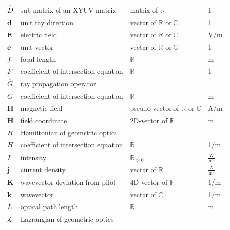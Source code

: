\documentclass[12pt,a4paper,twoside,openright,BCOR10mm,headsepline,titlepage,abstracton,chapterprefix,final]{scrreprt}
\newcommand\Vector[1]{{\mathbf{#1}}}
\newcommand\wavenumber{k}
\newcommand\Wavevector{\Vector{\wavenumber}}
\newcommand\scalarEfield{E}
\newcommand\scalarHfield{H}
\newcommand\Efield{\Vector{\scalarEfield}}
\newcommand\Hfield{\Vector{\scalarHfield}}
\newcommand\currentdensity{\Vector{j}}
\newcommand\meter{\textrm{m}}
\newcommand\ampere{\textrm{A}}
\newcommand\volt{\textrm{V}}
\newcommand\watt{\textrm{W}}
\begin{document}
\begin{tabular}{l|l|l|l}
 $\hat{D}$ & sub-matrix of an XYUV matrix & matrix of $\mathbb{R}$ & 1\\
 $\Vector{d}$ & unit ray direction & vector of $\mathbb{R}$ or $\mathbb{C}$ & 1\\
 \hline
 $\Efield$ & electric field & vector of $\mathbb{R}$ or $\mathbb{C}$ & \volt /\meter \\
 $\Vector{e}$ & unit vector & vector of $\mathbb{R}$ or $\mathbb{C}$ & 1\\
 \hline
 $f$ & focal length & $\mathbb{R}$ & \meter \\
 $F$ & coefficient of intersection equation & $\mathbb{R}$ & 1\\
 \hline
 $\hat{G}$ & ray propagation operator &&\\
 $G$ & coefficient of intersection equation & $\mathbb{R}$ & \meter\\
 \hline
 $\Hfield$ & magnetic field & pseudo-vector of $\mathbb{R}$ or $\mathbb{C}$ & \ampere /\meter \\
 $\Vector{H}$ & field coordinate & 2D-vector of $\mathbb{R}$ & \meter \\ 
 $H$ & Hamiltonian of geometric optics && \\
 $H$ & coefficient of intersection equation & $\mathbb{R}$ & 1/\meter \\
 \hline
 $I$ & intensity & $\mathbb{R}_{>0}$ & $\frac{\watt}{\meter^2}$ \\
 \hline
 $\currentdensity$ & current density & vector of $\mathbb{R}$ & $\frac{\ampere}{\meter^2}$ \\
 \hline
 $\Vector{K}$ & wavevector deviation from pilot & 4D-vector of $\mathbb{R}$ & 1/\meter \\
 $\Wavevector$ & wavevector & vector of $\mathbb{C}$ & 1/\meter \\
 \hline
 $L$ & optical path length & $\mathbb{R}$ & \meter \\
 $\mathcal{L}$ & Lagrangian of geometric optics &&\\
\end{tabular}\\
\end{document}
